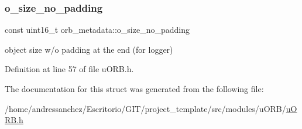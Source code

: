 \subsubsection{\texorpdfstring{o\+\_\+size\+\_\+no\+\_\+padding}{o\_size\_no\_padding}}
{\footnotesize\ttfamily const uint16\+\_\+t orb\+\_\+metadata\+::o\+\_\+size\+\_\+no\+\_\+padding}

object size w/o padding at the end (for logger) 

Definition at line 57 of file u\+O\+R\+B.\+h.



The documentation for this struct was generated from the following file\+:\begin{DoxyCompactItemize}
\item 
/home/andressanchez/\+Escritorio/\+G\+I\+T/project\+\_\+template/src/modules/u\+O\+R\+B/\hyperlink{uORB_8h}{u\+O\+R\+B.\+h}\end{DoxyCompactItemize}
